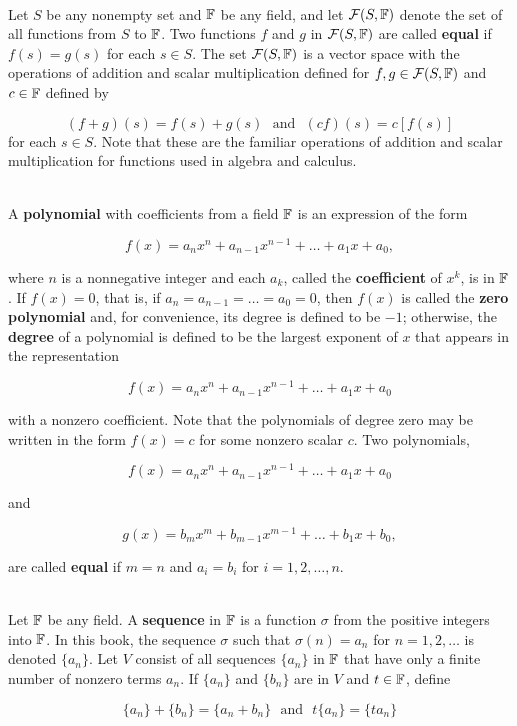 \begin{definition}
	\hfill\\
	Let $S$ be any nonempty set and $\mathbb{F}$ be any field, and let $\mathcal{F}(S, \mathbb{F})$ denote the set of all functions from $S$ to $\mathbb{F}$. Two functions $f$ and $g$ in $\mathcal{F}(S, \mathbb{F})$ are called \textbf{equal} if $f(s) = g(s)$ for each $s \in S$. The set $\mathcal{F}(S, \mathbb{F})$ is a vector space with the operations of addition and scalar multiplication defined for $f,g \in \mathcal{F}(S, \mathbb{F})$ and $c \in \mathbb{F}$ defined by
	
	\[(f + g)(s) = f(s) + g(s)\ \ \ \text{and}\ \ \ (cf)(s) = c[f(s)]\]
	for each $s \in S$. Note that these are the familiar operations of addition and scalar multiplication for functions used in algebra and calculus.
\end{definition}

\begin{definition}
	\hfill\\
	A \textbf{polynomial} with coefficients from a field $\mathbb{F}$ is an expression of the form 
	
	\[f(x)=a_nx^n + a_{n-1}x^{n-1}+\dots+a_1x+a_0,\]
	
	where $n$ is a nonnegative integer and each $a_k$, called the \textbf{coefficient} of $x^k$, is in $\mathbb{F}$. If $f(x)=0$, that is, if $a_n = a_{n-1} = \dots = a_0 = 0$, then $f(x)$ is called the \textbf{zero polynomial} and, for convenience, its degree is defined to be $-1$; otherwise, the \textbf{degree} of a polynomial is defined to be the largest exponent of $x$ that appears in the representation
	
	\[f(x)=a_nx^n + a_{n-1}x^{n-1}+\dots+a_1x+a_0\]
	
	with a nonzero coefficient. Note that the polynomials of degree zero may be written in the form $f(x) = c$ for some nonzero scalar $c$. Two polynomials,
	
	\[f(x)=a_nx^n + a_{n-1}x^{n-1}+\dots+a_1x+a_0\]
	
	and
	
	\[g(x)=b_mx^m + b_{m-1}x^{m-1}+\dots+b_1x+b_0,\]
	
	are called \textbf{equal} if $m=n$ and $a_i = b_i$ for $i=1, 2, \dots, n$.
\end{definition}

\begin{definition}
	\hfill\\
	Let $\mathbb{F}$ be any field. A \textbf{sequence} in $\mathbb{F}$ is a function $\sigma$ from the positive integers into $\mathbb{F}$. In this book, the sequence $\sigma$ such that $\sigma(n) = a_n$ for $n=1, 2, \dots$ is denoted $\{a_n\}$. Let $V$ consist of all sequences $\{a_n\}$ in $\mathbb{F}$ that have only a finite number of nonzero terms $a_n$. If $\{a_n\}$ and $\{b_n\}$ are in $V$ and $t \in \mathbb{F}$, define
	
	\[\{a_n\} + \{b_n\} = \{a_n + b_n\}\ \ \ \text{and}\ \ \ t\{a_n\} = \{ta_n\}\]
\end{definition}


